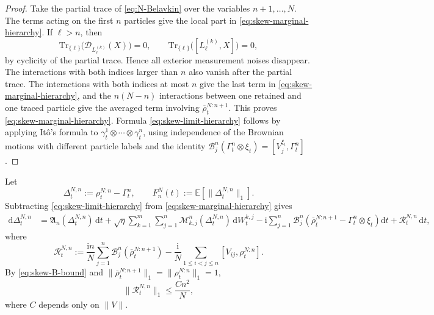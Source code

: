 \documentclass[10pt,a4paper,reqno]{amsart}
\numberwithin{equation}{section}
\theoremstyle{plain}
\theoremstyle{definition}
\theoremstyle{remark}
\renewcommand{\d}{\mathrm d}
\renewcommand{\i}{\mathrm i}
\newcommand{\Tr}{\mathrm{Tr}}
\newcommand{\E}{\mathbb E}
\newcommand{\cD}{\mathcal D}
\newcommand{\1}{\mathbf 1}
\begin{document}
\begin{proof}
Take the partial trace of \eqref{eq:N-Belavkin} over the variables \(n+1,\ldots,N\). The terms acting on the first \(n\) particles give the local part in \eqref{eq:skew-marginal-hierarchy}. If \(\ell>n\), then
\[
  \Tr_{\{ \ell\}}\bigl(\cD_{L_\ell^{(k)}}(X)\bigr)=0,
  \qquad
  \Tr_{\{ \ell\}}\bigl([L_\ell^{(k)},X]\bigr)=0,
\]
by cyclicity of the partial trace. Hence all exterior measurement noises disappear. The interactions with both indices larger than \(n\) also vanish after the partial trace. The interactions with both indices at most \(n\) give the last term in \eqref{eq:skew-marginal-hierarchy}, and the \(n(N-n)\) interactions between one retained and one traced particle give the averaged term involving \(\overline\rho_t^{N:n+1}\). This proves \eqref{eq:skew-marginal-hierarchy}. Formula \eqref{eq:skew-limit-hierarchy} follows by applying It\^o's formula to \(\gamma_t^1\otimes\cdots\otimes\gamma_t^n\), using independence of the Brownian motions with different particle labels and the identity \(\mathcal B_j^n(\Gamma_t^n\otimes\xi_t)=[V_j^{\xi_t},\Gamma_t^n]\).
\end{proof}

Let
\[
  \Delta_t^{N,n}:=\rho_t^{N:n}-\Gamma_t^n,
  \qquad
  F_n^N(t):=\E\left[\|\Delta_t^{N,n}\|_1\right].
\]
Subtracting \eqref{eq:skew-limit-hierarchy} from \eqref{eq:skew-marginal-hierarchy} gives
\begin{equation}
\begin{aligned}
  \d\Delta_t^{N,n}
  &=
 \mathfrak A_n(\Delta_t^{N,n})\,\d t
  +
  \sqrt{\eta}
  \sum_{k=1}^m\sum_{j=1}^n
  \mathcal M_{k,j}^n(\Delta_t^{N,n})\,\d W_t^{k,j}
  -
  \i
  \sum_{j=1}^n
  \mathcal B_j^n\left(
    \overline\rho_t^{N:n+1}
    -
    \Gamma_t^n\otimes\xi_t
  \right)\d t
  +
  \mathcal R_t^{N,n}\,\d t,
\end{aligned}
  \label{eq:skew-delta-equation}
\end{equation}
where
\begin{equation}
  \mathcal R_t^{N,n}
  :=
  \frac{\i n}{N}
  \sum_{j=1}^n
  \mathcal B_j^n(\overline\rho_t^{N:n+1})
  -
  \frac{\i}{N}
  \sum_{1\le i<j\le n}
  [V_{ij},\rho_t^{N:n}].
  \label{eq:skew-remainder}
\end{equation}
By \eqref{eq:skew-B-bound} and \(\|\overline\rho_t^{N:n+1}\|_1=\|\rho_t^{N:n}\|_1=1\),
\begin{equation}
  \|\mathcal R_t^{N,n}\|_1
  \le
  \frac{Cn^2}{N},
  \label{eq:skew-remainder-bound}
\end{equation}
where \(C\) depends only on \(\|V\|\).
\end{document}
